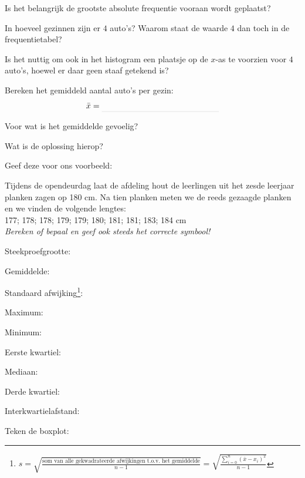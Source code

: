 \documentclass[12pt,twoside]{article}
\begin{document}
Is het belangrijk de grootste absolute frequentie vooraan wordt geplaatst?

In hoeveel gezinnen zijn er $4$ auto's? \arulefill
Waarom staat de waarde $4$ dan toch in de frequentietabel?

Is het nuttig om ook in het histogram een plaatsje op de $x$-as te voorzien voor $4$ auto's, hoewel er daar geen staaf getekend is?

Bereken het gemiddeld aantal auto's per gezin:
$$\bar{x}=\arule{5cm}$$

Voor wat is het gemiddelde gevoelig?

Wat is de oplossing hierop?

Geef deze voor ons voorbeeld:

\newpage
{}
Tijdens de opendeurdag laat de afdeling hout de leerlingen uit het zesde leerjaar planken zagen op 180 cm. Na tien planken meten we de reeds gezaagde planken en we vinden de volgende lengtes:\\
177; 178; 178; 179; 179; 180; 181; 181; 183; 184 cm\\

{\em Bereken of bepaal en geef ook steeds het correcte symbool!}

Steekproefgrootte:\arulefill

Gemiddelde:\arulefill

Standaard afwijking\footnote{$s = \sqrt{\frac{\mbox{som van alle gekwadrateerde afwijkingen t.o.v. het gemiddelde}}{n-1}} = \sqrt{\frac{\sum_{i=0}^n(\bar{x}-x_i)^2}{n-1}}$}:\arulefill

Maximum:\arulefill

Minimum:\arulefill

Eerste kwartiel:\arulefill

Mediaan:\arulefill

Derde kwartiel:\arulefill

Interkwartielafstand:\arulefill

Teken de boxplot:

\ruitjes{3cm}
\end{document}
